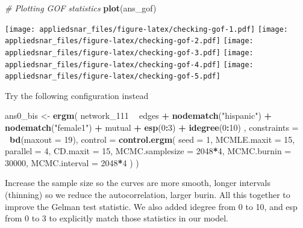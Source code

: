 \documentclass[]{book}
\newenvironment{Shaded}{\begin{snugshade}}{\end{snugshade}}
\newcommand{\KeywordTok}[1]{\textcolor[rgb]{0.13,0.29,0.53}{\textbf{#1}}}
\newcommand{\DataTypeTok}[1]{\textcolor[rgb]{0.13,0.29,0.53}{#1}}
\newcommand{\DecValTok}[1]{\textcolor[rgb]{0.00,0.00,0.81}{#1}}
\newcommand{\StringTok}[1]{\textcolor[rgb]{0.31,0.60,0.02}{#1}}
\newcommand{\CommentTok}[1]{\textcolor[rgb]{0.56,0.35,0.01}{\textit{#1}}}
\newcommand{\OperatorTok}[1]{\textcolor[rgb]{0.81,0.36,0.00}{\textbf{#1}}}
\newcommand{\NormalTok}[1]{#1}
\theoremstyle{definition}
\theoremstyle{definition}
\theoremstyle{definition}
\theoremstyle{remark}
\begin{document}
\begin{Shaded}
\begin{Highlighting}[]
\CommentTok{# Plotting GOF statistics}
\KeywordTok{plot}\NormalTok{(ans_gof)}
\end{Highlighting}
\end{Shaded}

\texttt{[image: appliedsnar\_files/figure-latex/checking-gof-1.pdf]}
\texttt{[image: appliedsnar\_files/figure-latex/checking-gof-2.pdf]}
\texttt{[image: appliedsnar\_files/figure-latex/checking-gof-3.pdf]}
\texttt{[image: appliedsnar\_files/figure-latex/checking-gof-4.pdf]}
\texttt{[image: appliedsnar\_files/figure-latex/checking-gof-5.pdf]}

Try the following configuration instead

\begin{Shaded}
\begin{Highlighting}[]
\NormalTok{ans0_bis <-}\StringTok{ }\KeywordTok{ergm}\NormalTok{(}
\NormalTok{  network_}\DecValTok{111} \OperatorTok{~}
\StringTok{    }\NormalTok{edges }\OperatorTok{+}
\StringTok{    }\KeywordTok{nodematch}\NormalTok{(}\StringTok{"hispanic"}\NormalTok{) }\OperatorTok{+}
\StringTok{    }\KeywordTok{nodematch}\NormalTok{(}\StringTok{"female1"}\NormalTok{) }\OperatorTok{+}
\StringTok{    }\NormalTok{mutual }\OperatorTok{+}\StringTok{ }
\StringTok{    }\KeywordTok{esp}\NormalTok{(}\DecValTok{0}\OperatorTok{:}\DecValTok{3}\NormalTok{) }\OperatorTok{+}\StringTok{ }
\StringTok{    }\KeywordTok{idegree}\NormalTok{(}\DecValTok{0}\OperatorTok{:}\DecValTok{10}\NormalTok{)}
\NormalTok{    ,}
  \DataTypeTok{constraints =} \OperatorTok{~}\KeywordTok{bd}\NormalTok{(}\DataTypeTok{maxout =} \DecValTok{19}\NormalTok{),}
  \DataTypeTok{control =} \KeywordTok{control.ergm}\NormalTok{(}
    \DataTypeTok{seed        =} \DecValTok{1}\NormalTok{,}
    \DataTypeTok{MCMLE.maxit =} \DecValTok{15}\NormalTok{,}
    \DataTypeTok{parallel    =} \DecValTok{4}\NormalTok{,}
    \DataTypeTok{CD.maxit    =} \DecValTok{15}\NormalTok{,}
    \DataTypeTok{MCMC.samplesize =} \DecValTok{2048}\OperatorTok{*}\DecValTok{4}\NormalTok{,}
    \DataTypeTok{MCMC.burnin =} \DecValTok{30000}\NormalTok{,}
    \DataTypeTok{MCMC.interval =} \DecValTok{2048}\OperatorTok{*}\DecValTok{4}
\NormalTok{    )}
\NormalTok{  )}
\end{Highlighting}
\end{Shaded}

Increase the sample size so the curves are more smooth, longer intervals
(thinning) so we reduce the autocorrelation, larger burin. All this
together to improve the Gelman test statistic. We also added idegree
from 0 to 10, and esp from 0 to 3 to explicitly match those statistics
in our model.
\end{document}
